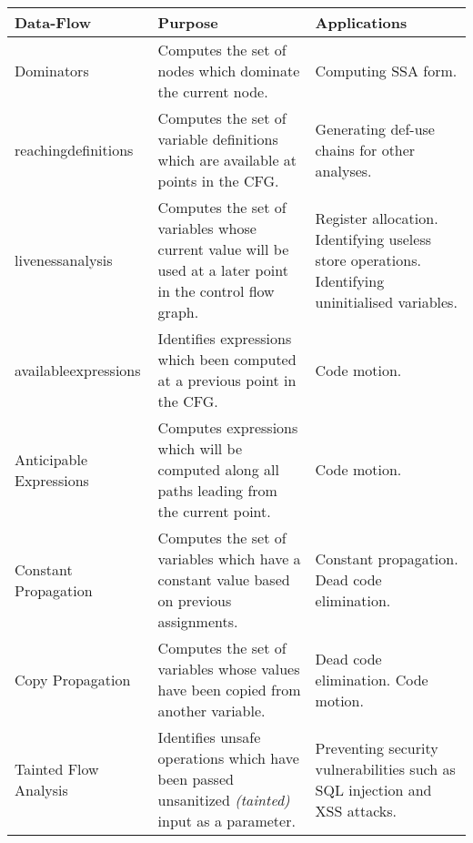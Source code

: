 \documentclass[bsc,twoside,singlespacing,parskip,logo,notimes,normalheadings]{infthesis}
\begin{document}
\begin{appendices}
\begin{center}
  \begin{tabular}{|l|p{5cm}|p{5cm}|}
    \hline
    {\bf Data-Flow}                         & {\bf Purpose}                                                                                              & {\bf Applications}                                                                              \\ \hline
    Dominators                              & Computes the set of nodes which dominate the current node.                                                 & Computing SSA form.                                                                             \\ \hline
    \Gls{reachingdefinition}s               & Computes the set of variable definitions which are available at points in the CFG.                         & Generating def-use chains for other analyses.                                                   \\ \hline
    \Gls{livenessanalysis}                  & Computes the set of variables whose current value will be used at a later point in the control flow graph. & Register allocation. Identifying useless store operations. Identifying uninitialised variables. \\ \hline
    \Gls{availableexpression}s              & Identifies expressions which been computed at a previous point in the CFG.                                 & Code motion.                                                                                    \\ \hline
    Anticipable Expressions                 & Computes expressions which will be computed along all paths leading from the current point.                & Code motion.                                                                                    \\ \hline
    Constant Propagation                    & Computes the set of variables which have a constant value based on previous assignments.                   & Constant propagation. Dead code elimination.                                                    \\ \hline
    Copy Propagation                        & Computes the set of variables whose values have been copied from another variable.                         & Dead code elimination. Code motion.                                                             \\ \hline
    Tainted Flow Analysis\cite{TaintedFlow} & Identifies unsafe operations which have been passed unsanitized {\em (tainted)} input as a parameter.      & Preventing security vulnerabilities such as SQL injection and XSS attacks.                      \\ \hline
  \end{tabular}
  \label{dfatypes}
\end{center}


\end{appendices}



\end{document}
